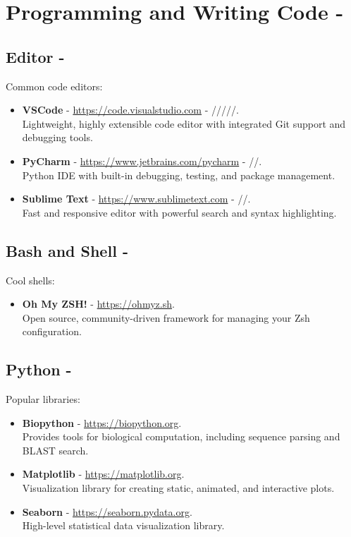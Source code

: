 \section{Programming and Writing Code - \faCode}
\subsection{Editor - \faEdit}
Common code editors:
\begin{itemize}
    \item \textbf{VSCode} -  \url{https://code.visualstudio.com} - \faLinux/\faApple/\faWindows/\faChrome/\faFirefox/\faInternetExplorer.\\
    Lightweight, highly extensible code editor with integrated Git support and debugging tools.
    \item \textbf{PyCharm} - \url{https://www.jetbrains.com/pycharm} - \faLinux/\faApple/\faWindows.\\
    Python IDE with built-in debugging, testing, and package management.
    \item \textbf{Sublime Text} - \url{https://www.sublimetext.com} - \faLinux/\faApple/\faWindows.\\
    Fast and responsive editor with powerful search and syntax highlighting.
\end{itemize}

\subsection{Bash and Shell - \faTerminal}
Cool shells:
\begin{itemize}
    \item \textbf{Oh My ZSH!} - \url{https://ohmyz.sh}.\\
    Open source, community-driven framework for managing your Zsh configuration. 
\end{itemize}

\subsection{Python - \faPython}
Popular libraries:
\begin{itemize}
    \item \textbf{Biopython} - \url{https://biopython.org}.\\
    Provides tools for biological computation, including sequence parsing and BLAST search.
    \item \textbf{Matplotlib} - \url{https://matplotlib.org}.\\
    Visualization library for creating static, animated, and interactive plots.
    \item \textbf{Seaborn} - \url{https://seaborn.pydata.org}.\\
    High-level statistical data visualization library.
\end{itemize}